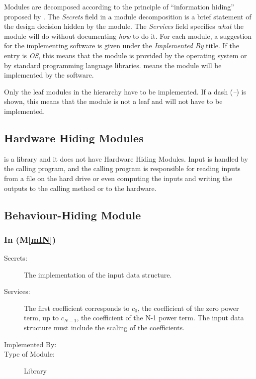 \documentclass[12pt, titlepage]{article}
\newcommand{\mref}[1]{M\ref{#1}}
\begin{document}
Modules are decomposed according to the principle of ``information hiding''
proposed by \citet{ParnasEtAl1984}. The \emph{Secrets} field in a module
decomposition is a brief statement of the design decision hidden by the
module. The \emph{Services} field specifies \emph{what} the module will do
without documenting \emph{how} to do it. For each module, a suggestion for the
implementing software is given under the \emph{Implemented By} title. If the
entry is \emph{OS}, this means that the module is provided by the operating
system or by standard programming language libraries.  \emph{} means the
module will be implemented by the  software.

Only the leaf modules in the hierarchy have to be implemented. If a dash
(\emph{--}) is shown, this means that the module is not a leaf and will not have
to be implemented.

\subsection{Hardware Hiding Modules}

 is a library and it does not have Hardware Hiding Modules.
Input is handled by the calling program, and the calling program is responsible for
reading inputs from a file on the hard drive or even computing the inputs and writing the outputs
to the calling method or to the hardware.
\subsection{Behaviour-Hiding Module}

\subsubsection{In (\mref{mIN})}

\begin{description}
\item[Secrets:] The implementation of the input data structure.
\item[Services:] The first coefficient corresponds to $c_0$, the coefficient of the zero
  power term, up to $c_{N-1}$,  the coefficient of the N-1 power term. The input data
  structure must include the scaling of the coefficients.
\item[Implemented By:] 
\item[Type of Module:] Library
\end{description}
\end{document}
